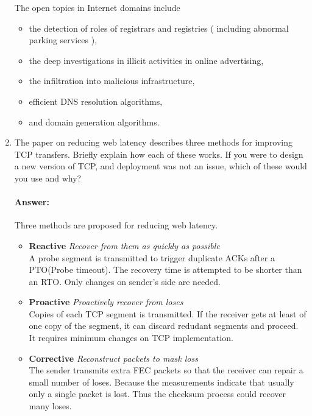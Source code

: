 \documentclass[a4paper,11pt]{article}
\theoremstyle{mytheor}
\begin{document}
\begin{enumerate}
The open topics in Internet domains include
\begin{itemize}
\item the detection of roles of registrars and registries ( including abnormal parking services ),
\item the deep investigations in illicit activities in online advertising,
\item the infiltration into malicious infrastructure,
\item efficient DNS resolution algorithms,
\item and domain generation algorithms.
\end{itemize}
\begin{comment}
\item 
The paper on SSL, HTTPS, and trust models describes a number of flaws with our system for secure communication. 
Choose three of these you feel are most important. 
Describe the aw and explain why this is a critical area where improvement is needed.
\paragraph{Answer:}
xx
\end{comment}

\item
The paper on reducing web latency describes three methods for improving TCP transfers. 
Briefly explain how each of these works. 
If you were to design a new version of TCP, and deployment was not an issue, which of these would you use and why?
\paragraph{Answer:}
Three methods are proposed for reducing web latency.
\begin{itemize}
\item \textbf{Reactive} \emph{Recover from them as quickly as possible} \\
A probe segment is transmitted to trigger duplicate ACKs after a PTO(Probe timeout).
The recovery time is attempted to be shorter than an RTO.
Only changes on sender's side are needed.
\item \textbf{Proactive} \emph{Proactively recover from loses} \\
Copies of each TCP segment is transmitted.
If the receiver gets at least of one copy of the segment, it can discard redudant segments and proceed.
It requires minimum changes on TCP implementation.
\item \textbf{Corrective} \emph{Reconstruct packets to mask loss} \\
The sender transmits extra FEC packets so that the receiver can repair a small number of loses.
Because the measurements indicate that usually only a single packet is lost.
Thus the checksum process could recover many loses.
\end{itemize}


\end{enumerate}
\end{document}
